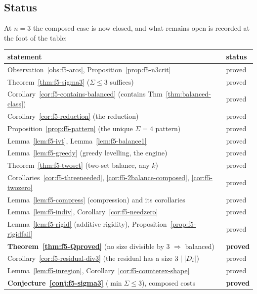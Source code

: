 \subsection{Status}
\label{sec:f5-status}

At $n = 3$ the composed case is now closed, and what remains open is recorded at
the foot of the table:

\begin{center}\small
\begin{tabular}{@{}ll@{}}
\toprule
statement & status \\
\midrule
Observation~\ref{obs:f5-arcs}, Proposition~\ref{prop:f5-n3crit} & proved \\
Theorem~\ref{thm:f5-sigma3} ($\Sigma \le 3$ suffices) & proved \\
Corollary~\ref{cor:f5-contains-balanced} (contains Thm~\ref{thm:balanced-class})
  & proved \\
Corollary~\ref{cor:f5-reduction} (the reduction) & proved \\
Proposition~\ref{prop:f5-pattern} (the unique $\Sigma = 4$ pattern) & proved \\
Lemma~\ref{lem:f5-ivt}, Lemma~\ref{lem:f5-balance1} & proved \\
Lemma~\ref{lem:f5-greedy} (greedy levelling, the engine) & proved \\
Theorem~\ref{thm:f5-twoset} (two-set balance, any $k$) & proved \\
Corollaries~\ref{cor:f5-threeneeded}, \ref{cor:f5-2balance-composed},
  \ref{cor:f5-twozero} & proved \\
Lemma~\ref{lem:f5-compress} (compression) and its corollaries & proved \\
Lemma~\ref{lem:f5-indiv}, Corollary~\ref{cor:f5-needzero} & proved \\
Lemma~\ref{lem:f5-rigid} (additive rigidity),
  Proposition~\ref{prop:f5-rigidfail} & proved \\
\textbf{Theorem~\ref{thm:f5-Qproved}} (no size divisible by $3$
  $\Rightarrow$ balanced) & \textbf{proved} \\
Corollary~\ref{cor:f5-residual-div3} (the residual has a size $3 \mid \left\lvert D_i\right\rvert$)
  & proved \\
Lemma~\ref{lem:f5-inregion}, Corollary~\ref{cor:f5-counterex-shape} & proved \\
\textbf{Conjecture~\ref{conj:f5-sigma3}} ($\min \Sigma \le 3$), composed costs
  & \textbf{proved} \\

\end{tabular}
\end{center}

